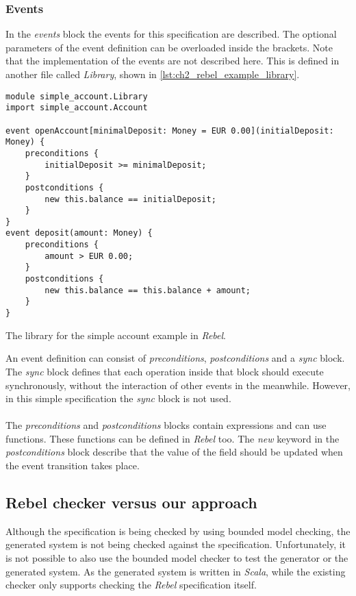 \subsubsection{Events}
In the \textit{events} block the events for this specification are described.
The optional parameters of the event definition can be overloaded inside the
brackets. Note that the implementation of the events are not described here.
This is defined in another file called \textit{Library}, shown in
\autoref{lst:ch2_rebel_example_library}.
\begin{sourcecode}[!ht]
\begin{lstlisting}[language=Rebel]
module simple_account.Library
import simple_account.Account

event openAccount[minimalDeposit: Money = EUR 0.00](initialDeposit: Money) {
    preconditions {
        initialDeposit >= minimalDeposit;
    }
    postconditions {
        new this.balance == initialDeposit;
    }
}
event deposit(amount: Money) {
    preconditions {
        amount > EUR 0.00;
    }
    postconditions {
        new this.balance == this.balance + amount;
    }
}
\end{lstlisting}
\caption{The library for the simple account example in \textit{Rebel}.}
\label{lst:ch2_rebel_example_library}
\end{sourcecode}
\FloatBarrier\noindent
An event definition can consist of \textit{preconditions},
\textit{postconditions} and a \textit{sync} block. The \textit{sync} block
defines that each operation inside that block should execute synchronously,
without the interaction of other events in the meanwhile. However, in this
simple specification the \textit{sync} block is not used.\\
\\
The \textit{preconditions} and \textit{postconditions} blocks contain
expressions and can use functions. These functions can be defined in
\textit{Rebel} too. The \textit{new} keyword in the \textit{postconditions}
block describe that the value of the field should be updated when the event
transition takes place.

\subsection{Rebel checker versus our approach}
Although the specification is being
checked by using bounded model checking, the generated system is not being
checked against the specification. Unfortunately, it is not possible to also use
the bounded model checker to test the generator or the generated system. As the
generated system is written in \textit{Scala}, while the existing checker only
supports checking the \textit{Rebel} specification itself.

